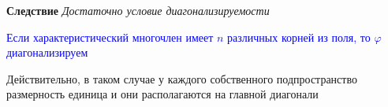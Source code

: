      \textbf{Следствие} \textit{Достаточно условие диагонализируемости}

    \textcolor{blue}{Если характеристический многочлен имеет $n$ различных корней из поля, то $\varphi$
        диагонализируем}

    Действительно, в таком случае у каждого собственного подпространство размерность единица и они располагаются на
    главной диагонали